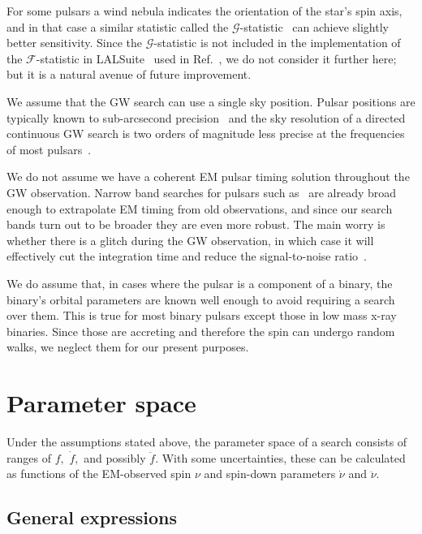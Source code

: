 \documentclass{ttuthes2007}
\begin{document}
For some pulsars a wind nebula indicates the orientation of the star's spin
axis, and in that case a similar statistic called the
$\mathcal{G}$-statistic~\cite{Jaranowski:2010rn} can achieve slightly better
sensitivity.
Since the $\mathcal{G}$-statistic is not included in the implementation of the
$\mathcal{F}$-statistic in LALSuite~\cite{LALSuite} used in
Ref.~\cite{Abbott:2018qee}, we do not consider it further here; but it is a
natural avenue of future improvement.

We assume that the \ac{GW} search can use a single sky position.
Pulsar positions are typically known to sub-arcsecond
precision~\cite{Manchester:2004bp} and the sky resolution of a directed
continuous \ac{GW} search is two orders of magnitude less precise at the
frequencies of most pulsars~\cite[e.g.]{Abbott:2018qee}.

We do not assume we have a coherent \ac{EM} pulsar timing solution throughout
the \ac{GW} observation.
Narrow band searches for pulsars such as~\cite{Abbott:2019bed} are already
broad enough to extrapolate \ac{EM} timing from old observations, and since
our search bands turn out to be broader they are even more robust.
The main worry is whether there is a glitch during the \ac{GW} observation, in
which case it will effectively cut the integration time and reduce the
signal-to-noise ratio~\cite{Ashton:2017wui}.

We do assume that, in cases where the pulsar is a component of a binary, the
binary's orbital parameters are known well enough to avoid requiring a search
over them.
This is true for most binary pulsars except those in low mass x-ray binaries.
Since those are accreting and therefore the spin can undergo random walks, we
neglect them for our present purposes.

\section{Parameter space}

Under the assumptions stated above, the parameter space of a search consists
of ranges of $f,$ $\dot f,$ and possibly $\ddot f.$
With some uncertainties, these can be calculated as functions of the
\ac{EM}-observed spin $\nu$ and spin-down parameters $\dot\nu$ and $\ddot\nu.$

\subsection{General expressions}
\end{document}

